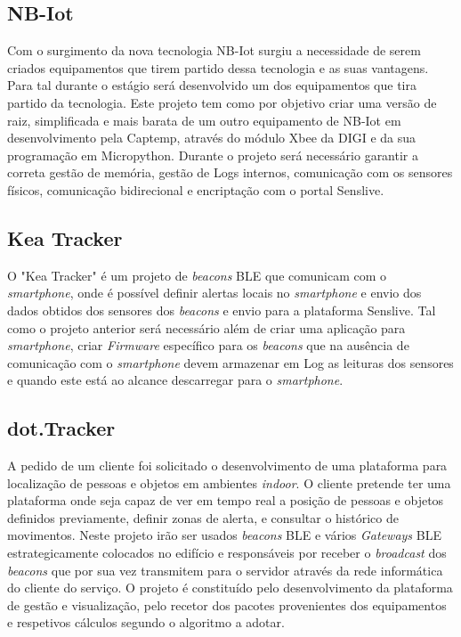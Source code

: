\subsection{NB-Iot}
Com o surgimento da nova tecnologia NB-Iot surgiu a necessidade de serem criados equipamentos que tirem partido dessa tecnologia e as suas vantagens. Para tal durante o estágio será desenvolvido um dos equipamentos que tira partido da tecnologia. Este projeto tem como por objetivo criar uma versão de raiz, simplificada e mais barata de um outro equipamento de NB-Iot em desenvolvimento pela Captemp, através do módulo Xbee da DIGI e da sua programação em Micropython. Durante o projeto será necessário garantir a correta gestão de memória, gestão de Logs internos, comunicação com os sensores físicos, comunicação bidirecional e encriptação com o portal Senslive.
\subsection{Kea Tracker}
O "Kea Tracker" é um projeto de \textit{beacons} BLE que comunicam com o \textit{smartphone}, onde é possível definir alertas locais no \textit{smartphone} e envio dos dados obtidos dos sensores dos \textit{beacons} e envio para a plataforma Senslive.
Tal como o projeto anterior será necessário além de criar uma aplicação para \textit{smartphone}, criar \textit{Firmware} específico para os \textit{beacons} que na ausência de comunicação com o \textit{smartphone} devem armazenar em Log as leituras dos sensores e quando este está ao alcance descarregar para o \textit{smartphone}.
\subsection{dot.Tracker}
A pedido de um cliente foi solicitado o desenvolvimento de uma plataforma para localização de pessoas e objetos em ambientes \textit{indoor}. O cliente pretende ter uma plataforma onde seja capaz de ver em tempo real a posição de pessoas e objetos definidos previamente, definir zonas de alerta, e consultar o histórico de movimentos. Neste projeto irão ser usados \textit{beacons} BLE e vários \textit{Gateways} BLE estrategicamente colocados no edifício e responsáveis por receber o \textit{broadcast} dos \textit{beacons} que por sua vez transmitem para o servidor através da rede informática do cliente do serviço. O projeto é constituído pelo desenvolvimento da plataforma de gestão e visualização, pelo recetor dos pacotes provenientes dos equipamentos e respetivos cálculos segundo o algoritmo a adotar.

